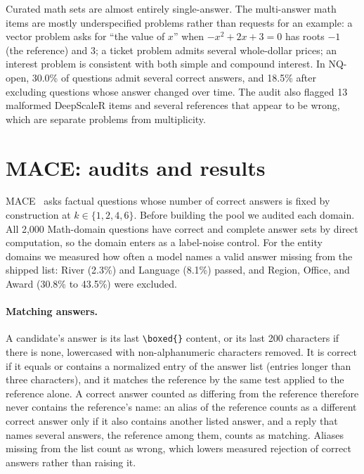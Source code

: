Curated math sets are almost entirely single-answer. The multi-answer math items are mostly underspecified problems rather than requests for an example: a vector problem asks for ``the value of $x$'' when $-x^2+2x+3=0$ has roots $-1$ (the reference) and $3$; a ticket problem admits several whole-dollar prices; an interest problem is consistent with both simple and compound interest. In NQ-open, 30.0\% of questions admit several correct answers, and 18.5\% after excluding questions whose answer changed over time. The audit also flagged 13 malformed DeepScaleR items and several references that appear to be wrong, which are separate problems from multiplicity.

\FloatBarrier
\section{\textsc{MACE}: audits and results}
\label{app:mace}

\textsc{MACE}~\citep{mace2026} asks factual questions whose number of correct answers is fixed by construction at $k \in \{1,2,4,6\}$. Before building the pool we audited each domain. All 2,000 Math-domain questions have correct and complete answer sets by direct computation, so the domain enters as a label-noise control. For the entity domains we measured how often a model names a valid answer missing from the shipped list: River (2.3\%) and Language (8.1\%) passed, and Region, Office, and Award (30.8\% to 43.5\%) were excluded.

\paragraph{Matching answers.} A candidate's answer is its last \texttt{\textbackslash boxed\{\}} content, or its last 200 characters if there is none, lowercased with non-alphanumeric characters removed. It is correct if it equals or contains a normalized entry of the answer list (entries longer than three characters), and it matches the reference by the same test applied to the reference alone. A correct answer counted as differing from the reference therefore never contains the reference's name: an alias of the reference counts as a different correct answer only if it also contains another listed answer, and a reply that names several answers, the reference among them, counts as matching. Aliases missing from the list count as wrong, which lowers measured rejection of correct answers rather than raising it.

